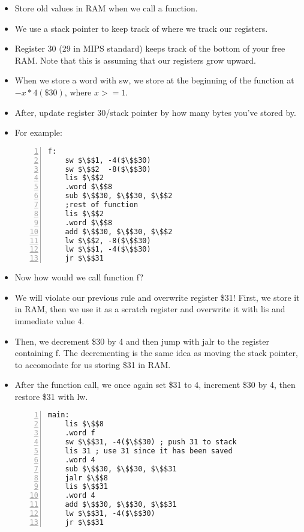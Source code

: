 \documentclass[12pt]{article}
\begin{document}
\begin{itemize}
    \item Store old values in RAM when we call a function.
    \item We use a stack pointer to keep track of where we track our registers.
    \item Register 30 (29 in MIPS standard) keeps track of the bottom of your free RAM.  Note that this is assuming that our registers grow upward.
    \item When we store a word with sw, we store at the beginning of the function at $-x*4(\$30)$, where $x >= 1$.  
    \item After, update register 30/stack pointer by how many bytes you've stored by.
    \item For example:
        \begin{lstlisting}[mathescape, numbers=left, breaklines=true]
f: 
    sw $\$$1, -4($\$$30)
    sw $\$$2  -8($\$$30)
    lis $\$$2
    .word $\$$8
    sub $\$$30, $\$$30, $\$$2
    ;rest of function
    lis $\$$2
    .word $\$$8
    add $\$$30, $\$$30, $\$$2
    lw $\$$2, -8($\$$30)
    lw $\$$1, -4($\$$30)
    jr $\$$31
        \end{lstlisting}
    \item Now how would we call function f?
    \item We will violate our previous rule and overwrite register \$31!  First, we store it in RAM, then we use it as a scratch register and overwrite it with lis and immediate value 4.  
    \item Then, we decrement \$30 by 4 and then jump with jalr to the register containing f.  The decrementing is the same idea as moving the stack pointer, to accomodate for us storing \$31 in RAM.
    \item After the function call, we once again set \$31 to 4, increment \$30 by 4, then restore \$31 with lw.
        \begin{lstlisting}[mathescape, numbers=left, breaklines=true]
main:
    lis $\$$8
    .word f
    sw $\$$31, -4($\$$30) ; push 31 to stack
    lis 31 ; use 31 since it has been saved
    .word 4
    sub $\$$30, $\$$30, $\$$31
    jalr $\$$8
    lis $\$$31
    .word 4
    add $\$$30, $\$$30, $\$$31
    lw $\$$31, -4($\$$30)
    jr $\$$31
        \end{lstlisting} 
\end{itemize}
\end{document}
